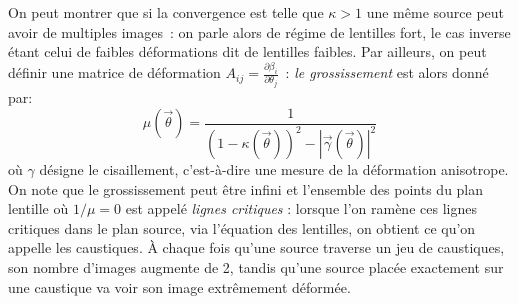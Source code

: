 On peut montrer que si la convergence est telle que $\kappa >1$ une même source peut avoir de multiples images~: on parle alors de régime de lentilles fort, le cas inverse étant celui de faibles déformations dit de lentilles faibles. Par ailleurs, on peut définir une matrice de déformation $A_{ij}=\frac{\partial \beta_i}{\partial \theta_j}$~: \textit{le grossissement} est alors donné par:
\begin{equation}
\mu(\vec{\theta})=\frac{1}{(1-\kappa(\vec{\theta}))^2 - |\vec{\gamma}(\vec{\theta})|^2}
\end{equation} 
où $\gamma$ désigne le cisaillement, c'est-à-dire une mesure de la déformation anisotrope. On note que le grossissement peut être infini et l'ensemble des points du plan lentille où $1/\mu=0$ est appelé \textit{lignes critiques} : lorsque l'on ramène ces lignes critiques dans le plan source, via l'équation des lentilles, on obtient ce qu'on appelle les caustiques. À chaque fois qu'une source traverse un jeu de caustiques, son nombre d'images augmente de 2, tandis qu'une source placée exactement sur une caustique va voir son image extrêmement déformée.

